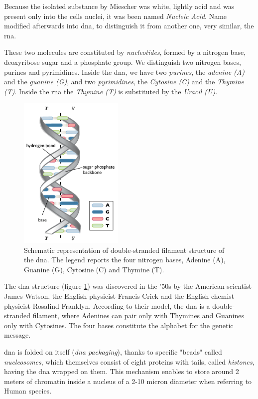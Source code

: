 Because the isolated substance by Miescher was white, lightly acid and was present only into the cells nuclei, it was been named \textit{Nucleic Acid}.
Name modified afterwards into \gls{dna}, to distinguish it from another one, very similar, the \gls{rna}.

These two molecules are constituted by \textit{nucleotides}, formed by a nitrogen base, deoxyribose sugar and a phosphate group.
We distinguish two nitrogen bases, purines and pyrimidines.
Inside the \gls{dna}, we have two \textit{purines}, the \textit{adenine (A)} and the \textit{guanine (G)}, and two \textit{pyrimidines}, the \textit{Cytosine (C)} and the \textit{Thymine (T)}.
Inside the \gls{rna} the \textit{Thymine (T)} is substituted by the \textit{Uracil (U)}.

\begin{figure}[h]
\centering
\includegraphics[width=5cm, keepaspectratio]{img/intro/dna1.png}
\caption[The \gls{dna}]{Schematic representation of double-stranded filament structure of the \gls{dna}. The legend reports the four nitrogen bases, Adenine (A), Guanine (G), Cytosine (C) and Thymine (T).}
\label{fig:dna}
\end{figure}

The \gls{dna} structure (figure \ref{fig:dna}) was discovered in the '50s by the American scientist James Watson, the English physicist Francis Crick and the English chemist-physicist Rosalind Franklyn.
According to their model, the \gls{dna} is a double-stranded filament, where Adenines can pair only with Thymines and Guanines only with Cytosines.
The four bases constitute the alphabet for the genetic message.

\gls{dna} is folded on itself (\textit{\gls{dna} packaging}), thanks to specific "beads" called \textit{nucleosomes}, which themselves consist of eight proteins with tails, called \textit{histones}, having the \gls{dna} wrapped on them.
This mechanism enables to store around 2 meters of chromatin inside a nucleus of a 2-10 micron diameter when referring to Human species.

